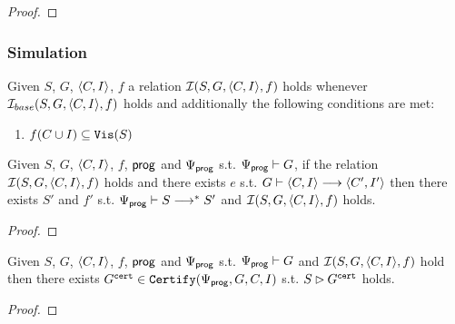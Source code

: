 \documentclass[12pt]{article}
\begin{document}
\begin{proof}

\end{proof}

\subsubsection{Simulation}

\begin{definition}
  Given $S$, $G$, $\langle C, I \rangle$, $f$ a relation $\mathcal{I}(S, G, \langle C, I \rangle, f)$ holds
  whenever $\mathcal{I}_{base}(S, G, \langle C, I \rangle, f)$ holds and additionally
  the following conditions are met:
  \begin{enumerate}[label=\textbf{S.\arabic*},start=7]
    \item \label{item:sim-vis}
       $f(C \cup I) \subseteq {\mathtt{Vis}}(S)$
  \end{enumerate}
\end{definition}

\begin{lemma}
  Given $S$, $G$, $\langle C, I \rangle$, $f$, $\mathsf{prog}$ and $\Psi_{\mathsf{prog}}$
  s.t. $\Psi_{\mathsf{prog}} \vdash G$,
  if the relation $\mathcal{I}(S, G, \langle C, I \rangle, f)$ holds
  and there exists $e$ s.t. $G \vdash \langle C, I \rangle \longrightarrow \langle C', I' \rangle$
  then there exists $S'$ and $f'$ s.t.
  $\Psi_{\mathsf{prog}} \vdash S \longrightarrow^* S'$ and
  $\mathcal{I}(S, G, \langle C, I \rangle, f)$ holds.
\end{lemma}

\begin{proof}
  
\end{proof}

\begin{lemma}
  Given $S$, $G$, $\langle C, I \rangle$, $f$, $\mathsf{prog}$ and $\Psi_{\mathsf{prog}}$
  s.t. $\Psi_{\mathsf{prog}} \vdash G$ and $\mathcal{I}(S, G, \langle C, I \rangle, f)$ hold
  then there exists $G^{{\mathtt{cert}}} \in {\mathtt{Certify}}(\Psi_{\mathsf{prog}}, G, C, I)$ s.t.
  $S \rhd G^{{\mathtt{cert}}}$ holds.
\end{lemma}

\begin{proof}
  
\end{proof}
  
\setmonofont[Mapping=tex-text]{CMU Typewriter Text}


\end{document}
